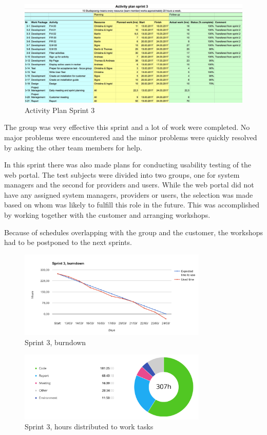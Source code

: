 \begin{figure}[ht]
\centering
    \includegraphics[width=\textwidth]{fig/activity_plan_3}
\caption{Activity Plan Sprint 3}
\end{figure}

The group was very effective this sprint and a lot of work were completed. No major problems were encountered and the minor problems were quickly resolved by asking the other team members for help.

In this sprint there was also made plans for conducting usability testing of the web portal. The test subjects were divided into two groups, one for system managers and the second for providers and users. While the web portal did not have any assigned system managers, providers or users, the selection was made based on whom was likely to fulfill this role in the future. This was accomplished by working together with the customer and arranging workshops. 

Because of schedules overlapping with the group and the customer, the workshops had to be postponed to the next sprints.

\begin{figure}[ht]
\centering
    \includegraphics[width=0.8\textwidth]{fig/sprint3}
\caption{Sprint 3, burndown}
\end{figure}

\begin{figure}[ht]
\centering
    \includegraphics[width=0.8\textwidth]{fig/sprint3-diagram}
\caption{Sprint 3, hours distributed to work tasks}
\end{figure}

